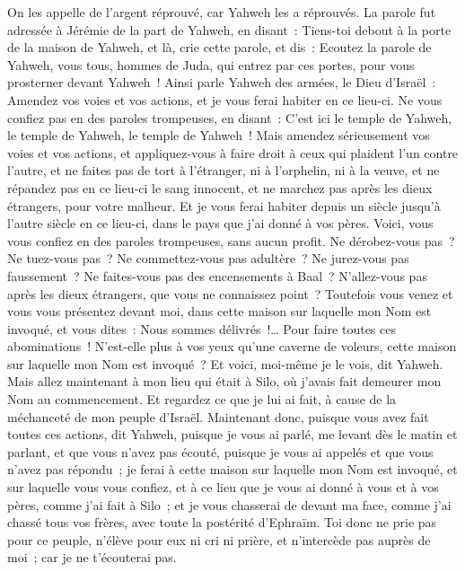 \begin{multicols}{2}
On les appelle de l'argent réprouvé, car Yahweh les a réprouvés.
\VerseOne{}La parole fut adressée à Jérémie de la part de Yahweh, en disant~:
Tiens-toi debout à la porte de la maison de Yahweh, et là, crie cette parole, et dis~: Ecoutez la parole de Yahweh, vous tous, hommes de Juda, qui entrez par ces portes, pour vous prosterner devant Yahweh~!
Ainsi parle Yahweh des armées, le Dieu d'Israël~: Amendez vos voies et vos actions, et je vous ferai habiter en ce lieu-ci.
Ne vous confiez pas en des paroles trompeuses, en disant~: C'est ici le temple de Yahweh, le temple de Yahweh, le temple de Yahweh~!
Mais amendez sérieusement vos voies et vos actions, et appliquez-vous à faire droit à ceux qui plaident l'un contre l'autre,
et ne faites pas de tort à l'étranger, ni à l'orphelin, ni à la veuve, et ne répandez pas en ce lieu-ci le sang innocent, et ne marchez pas après les dieux étrangers, pour votre malheur.
Et je vous ferai habiter depuis un siècle jusqu'à l'autre siècle en ce lieu-ci, dans le pays que j'ai donné à vos pères.
Voici, vous vous confiez en des paroles trompeuses, sans aucun profit.
Ne dérobez-vous pas~? Ne tuez-vous pas~? Ne commettez-vous pas adultère~? Ne jurez-vous pas faussement~? Ne faites-vous pas des encensements à Baal~? N'allez-vous pas après les dieux étrangers, que vous ne connaissez point~?
Toutefois vous venez et vous vous présentez devant moi, dans cette maison sur laquelle mon Nom est invoqué, et vous dites~: Nous sommes délivrés~!… Pour faire toutes ces abominations~!
N'est-elle plus à vos yeux qu'une caverne de voleurs, cette maison sur laquelle mon Nom est invoqué~? Et voici, moi-même je le vois, dit Yahweh.
Mais allez maintenant à mon lieu qui était à Silo, où j'avais fait demeurer mon Nom au commencement. Et regardez ce que je lui ai fait, à cause de la méchanceté de mon peuple d'Israël.
Maintenant donc, puisque vous avez fait toutes ces actions, dit Yahweh, puisque je vous ai parlé, me levant dès le matin et parlant, et que vous n'avez pas écouté, puisque je vous ai appelés et que vous n'avez pas répondu~;
je ferai à cette maison sur laquelle mon Nom est invoqué, et sur laquelle vous vous confiez, et à ce lieu que je vous ai donné à vous et à vos pères, comme j'ai fait à Silo~;
et je vous chasserai de devant ma face, comme j'ai chassé tous vos frères, avec toute la postérité d'Ephraïm.
Toi donc ne prie pas pour ce peuple, n'élève pour eux ni cri ni prière, et n'intercède pas auprès de moi~; car je ne t'écouterai pas.

\end{multicols}
